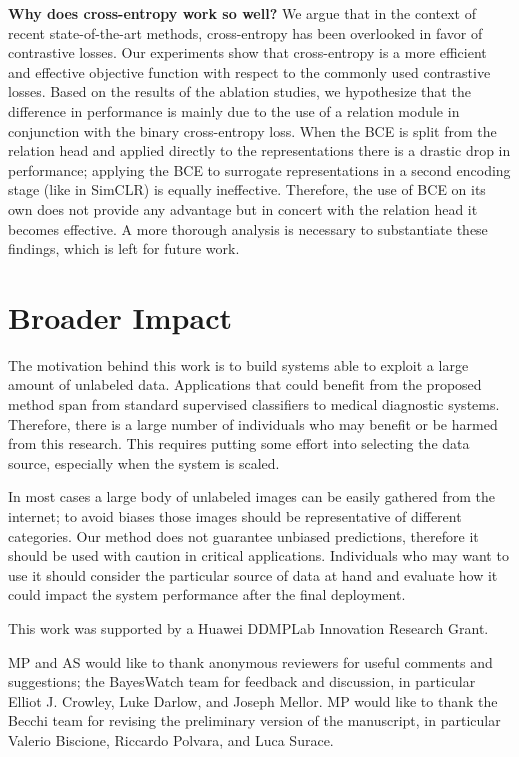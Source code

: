 \documentclass{article}
\begin{document}
\textbf{Why does cross-entropy work so well?}
We argue that in the context of recent state-of-the-art methods, cross-entropy has been overlooked in favor of contrastive losses. Our experiments show that cross-entropy is a more efficient and effective objective function with respect to the commonly used contrastive losses. Based on the results of the ablation studies, we hypothesize that the difference in performance is mainly due to the use of a relation module in conjunction with the binary cross-entropy loss. When the BCE is split from the relation head and applied directly to the representations there is a drastic drop in performance; applying the BCE to surrogate representations in a second encoding stage (like in SimCLR) is equally ineffective. Therefore, the use of BCE on its own does not provide any advantage but in concert with the relation head it becomes effective. A more thorough analysis is necessary to substantiate these findings, which is left for future work.


\section*{Broader Impact}

The motivation behind this work is to build systems able to exploit a large amount of unlabeled data. Applications that could benefit from the proposed method span from standard supervised classifiers to medical diagnostic systems. Therefore, there is a large number of individuals who may benefit or be harmed from this research. This requires putting some effort into selecting the data source, especially when the system is scaled. 

In most cases a large body of unlabeled images can be easily gathered from the internet; to avoid biases those images should be representative of different categories. Our method does not guarantee unbiased predictions, therefore it should be used with caution in critical applications. Individuals who may want to use it should consider the particular source of data at hand and evaluate how it could impact the system performance after the final deployment.

\begin{ack}
This work was supported by a Huawei DDMPLab Innovation Research Grant.

MP and AS would like to thank anonymous reviewers for useful comments and suggestions; the BayesWatch team for feedback and discussion, in particular Elliot J. Crowley, Luke Darlow, and Joseph Mellor. MP would like to thank the Becchi team for revising the preliminary version of the manuscript, in particular Valerio Biscione, Riccardo Polvara, and Luca Surace.

\end{ack}
\end{document}
